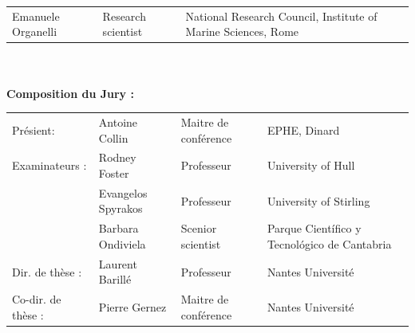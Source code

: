 \begin{titlepage}
\begin{tabular}{@{}l l l@{}}
    {\fontsize{10}{14}\selectfont \textcolor{textgray}{Emanuele Organelli}} & 
    {\fontsize{10}{14}\selectfont \textcolor{textgray}{Research scientist}} & 
    {\fontsize{10}{14}\selectfont \textcolor{textgray}{National Research Council, Institute of Marine Sciences, Rome}} \\
\end{tabular}\\\\

{\fontsize{12}{16}\selectfont \textbf{Composition du Jury : }}

\begin{tabular}{@{}l l l l@{}}
    {\fontsize{10}{14}\selectfont \textcolor{textgray}{Présient:}} & 
    {\fontsize{10}{14}\selectfont \textcolor{textgray}{Antoine Collin}} & 
    {\fontsize{10}{14}\selectfont \textcolor{textgray}{Maitre de conférence}} & 
    {\fontsize{10}{14}\selectfont \textcolor{textgray}{EPHE, Dinard}} \\

    {\fontsize{10}{14}\selectfont \textcolor{textgray}{Examinateurs :}} & 
    {\fontsize{10}{14}\selectfont \textcolor{textgray}{Rodney Foster}} & 
    {\fontsize{10}{14}\selectfont \textcolor{textgray}{Professeur}} & 
    {\fontsize{10}{14}\selectfont \textcolor{textgray}{University of Hull}} \\

    {\fontsize{10}{14}\selectfont \textcolor{textgray}{}} & 
    {\fontsize{10}{14}\selectfont \textcolor{textgray}{Evangelos Spyrakos}} & 
    {\fontsize{10}{14}\selectfont \textcolor{textgray}{Professeur}} & 
    {\fontsize{10}{14}\selectfont \textcolor{textgray}{University of Stirling}} \\

    {\fontsize{10}{14}\selectfont \textcolor{textgray}{}} & 
    {\fontsize{10}{14}\selectfont \textcolor{textgray}{Barbara Ondiviela}} & 
    {\fontsize{10}{14}\selectfont \textcolor{textgray}{Scenior scientist}} & 
    {\fontsize{10}{14}\selectfont \textcolor{textgray}{Parque Científico y Tecnológico de Cantabria}} \\

    {\fontsize{10}{14}\selectfont \textcolor{textgray}{Dir. de thèse :}} & 
    {\fontsize{10}{14}\selectfont \textcolor{textgray}{Laurent Barillé}} & 
    {\fontsize{10}{14}\selectfont \textcolor{textgray}{Professeur}} & 
    {\fontsize{10}{14}\selectfont \textcolor{textgray}{Nantes Université}} \\

    {\fontsize{10}{14}\selectfont \textcolor{textgray}{Co-dir. de thèse :}} & 
    {\fontsize{10}{14}\selectfont \textcolor{textgray}{Pierre Gernez}} & 
    {\fontsize{10}{14}\selectfont \textcolor{textgray}{Maitre de conférence}} & 
    {\fontsize{10}{14}\selectfont \textcolor{textgray}{Nantes Université}} \\
\end{tabular} \\\\


\end{titlepage}
